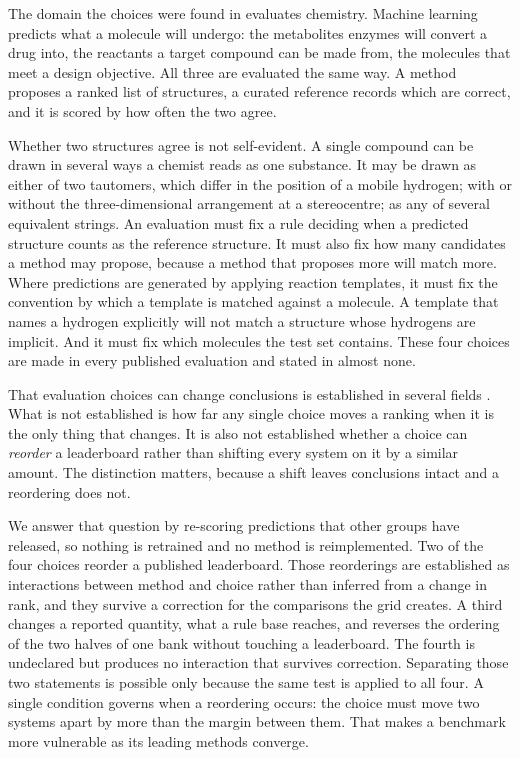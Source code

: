 \documentclass{article}
\begin{document}
The domain the choices were found in evaluates chemistry. Machine learning predicts what a molecule
will undergo: the metabolites enzymes will convert a drug into, the reactants a target compound can
be made from, the molecules that meet a design objective. All three are evaluated the same way. A
method proposes a ranked list of structures, a curated reference records which are correct, and it
is scored by how often the two agree.

Whether two structures agree is not self-evident. A single compound can be drawn in several ways a
chemist reads as one substance. It may be drawn as either of two tautomers, which differ in the
position of a mobile hydrogen; with or without the three-dimensional arrangement at a stereocentre;
as any of several equivalent strings. An evaluation must fix a rule deciding when a predicted
structure counts as the reference structure. It must also fix how many candidates a method may
propose, because a method that proposes more will match more. Where predictions are generated by
applying reaction templates, it must fix the convention by which a template is matched against a
molecule. A template that names a hydrogen explicitly will not match a structure whose hydrogens are
implicit. And it must fix which molecules the test set contains. These four choices are made in
every published evaluation and stated in almost none.

That evaluation choices can change conclusions is established in several fields
\citep{Maziarz_2025, Zhong_2020, Kamalloo_2023, agarwal2026metric}. What is not established is how
far any single choice moves a ranking when it is the only thing that changes. It is also not
established whether a choice can \emph{reorder} a leaderboard rather than shifting every system on
it by a similar amount. The distinction matters, because a shift leaves conclusions intact and a
reordering does not.

We answer that question by re-scoring predictions that other groups have released, so nothing is
retrained and no method is reimplemented. Two of the four choices reorder a published leaderboard.
Those reorderings are established as interactions between method and choice rather than inferred
from a change in rank, and they survive a correction for the comparisons the grid creates. A third changes a reported quantity, what a rule base reaches, and reverses the
ordering of the two halves of one bank without touching a leaderboard. The fourth is undeclared but
produces no interaction that survives correction. Separating those two statements is possible only
because the same test is applied to all four. A single condition governs when a reordering occurs:
the choice must move two systems apart by more than the margin between them. That makes a benchmark
more vulnerable as its leading methods converge.
\end{document}
